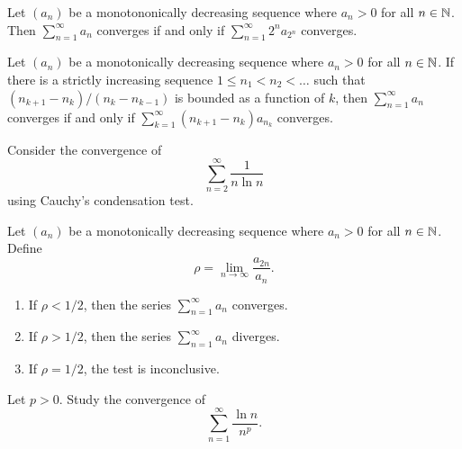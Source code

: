\begin{proposition}
  Let $(a_n)$ be a monotononically decreasing sequence where $a_n
  > 0$ for all $n \in \mathbb N$. Then $\sum_{n = 1}^{\infty} a_n$
  converges if and only if $\sum_{n = 1}^{\infty} 2^n a_{2^n}$ converges.
\end{proposition}

\begin{proposition}
  Let $(a_n)$ be a monotonically decreasing sequence where $a_n >
  0$ for all $n \in \mathbb N$. If there is a strictly increasing sequence
  $1 \leq n_1 < n_2 < \dots$ such that $(n_{k + 1} - n_k) / (n_{k} -
  n_{k - 1})$ is bounded as a function of $k$, then $\sum_{n =
  1}^{\infty} a_n$ converges if and only if $\sum_{k = 1}^{\infty}
  (n_{k + 1} - n_k) a_{n_k}$ converges.
\end{proposition}

\begin{example}
  Consider the convergence of
  \[ \sum_{n = 2}^{\infty} \frac{1}{n \ln n} \]
  using Cauchy's condensation test.
\end{example}

\begin{proposition}
  Let $(a_n)$ be a monotonically decreasing sequence where $a_n > 0$
  for all $n \in \mathbb N$. Define
  \[ \rho = \lim_{n \to \infty} \frac{a_{2n}}{a_n}. \]
  \begin{enumerate}
    \item If $\rho < 1/2$, then the series $\sum_{n = 1}^{\infty}
      a_n$ converges.
    \item If $\rho > 1/2$, then the series $\sum_{n = 1}^{\infty} a_n$ diverges.
    \item If $\rho = 1/2$, the test is inconclusive.
  \end{enumerate}
\end{proposition}

\begin{example}
  Let $p > 0$. Study the convergence of
  \[ \sum_{n = 1}^{\infty} \frac{\ln n}{n^p}. \]
\end{example}

